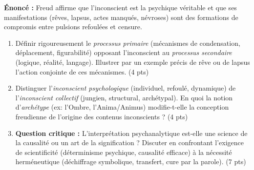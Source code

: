 \documentclass[11pt]{article}
\begin{document}
\begin{exercice}
\textbf{Énoncé :} Freud affirme que \og l'inconscient est la psychique véritable \fg{} et que ses manifestations (rêves, lapsus, actes manqués, névroses) sont des formations de compromis entre pulsions refoulées et censure.
\begin{enumerate}
    \item Définir rigoureusement le \textit{processus primaire} (mécanismes de condensation, déplacement, figurabilité) opposant l'inconscient au \textit{processus secondaire} (logique, réalité, langage). Illustrer par un exemple précis de rêve ou de lapsus l'action conjointe de ces mécanismes. (4 pts)
    \item Distinguer l'\textit{inconscient psychologique} (individuel, refoulé, dynamique) de l'\textit{inconscient collectif} (jungien, structural, archétypal). En quoi la notion d'\textit{archétype} (ex: l'Ombre, l'Anima/Animus) modifie-t-elle la conception freudienne de l'origine des contenus inconscients ? (4 pts)
    \item \textbf{Question critique :} \og L'interprétation psychanalytique est-elle une science de la causalité ou un art de la signification ? \fg{} Discuter en confrontant l'exigence de scientificité (déterminisme psychique, causalité efficace) à la nécessité herméneutique (déchiffrage symbolique, transfert, cure par la parole). (7 pts)
\end{enumerate}
\end{exercice}
\end{document}
